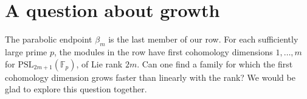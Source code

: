 \section{A question about growth}
The parabolic endpoint $\beta_m$ is the last member of our row. For each
sufficiently large prime $p$, the modules in the row have first cohomology
dimensions $1,\ldots,m$ for $\mathrm{PSL}_{2m+1}(\mathbb F_p)$, of Lie rank $2m$.
Can one find a family for
which the first cohomology dimension grows faster than linearly with the rank?
We would be glad to explore this question together.
